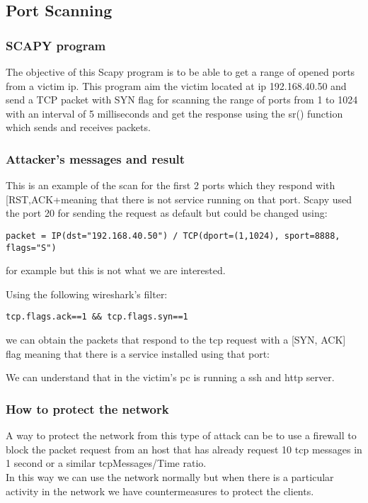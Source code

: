 \subsection{Port Scanning}
\subsubsection{SCAPY program}

The objective of this Scapy program is to be able to get a range of opened ports from a victim ip. This program aim the victim located at ip 192.168.40.50 and send a TCP packet with SYN flag for scanning the range of ports from 1 to 1024 with an interval of 5 milliseconds and get the response using the sr() function which sends and receives packets.\par

\subsubsection{Attacker’s messages and result}


This is an example of the scan for the first 2 ports which they respond with [RST,ACK+meaning that there is not service running on that port.
Scapy used the port 20 for sending the request as default but could be changed using:\\
\begin{lstlisting}
packet = IP(dst="192.168.40.50") / TCP(dport=(1,1024), sport=8888, flags="S")
\end{lstlisting}
for example but this is not what we are interested.\par
Using the following wireshark’s filter: \\
\begin{lstlisting}
tcp.flags.ack==1 && tcp.flags.syn==1
\end{lstlisting}
we can obtain the packets that respond to the tcp request with a [SYN, ACK] flag meaning that there is a service installed using that port:\par
\medskip


We can understand that in the victim’s pc is running a ssh and http server.\par

\subsubsection{How to protect the network}
A way to protect the network from this type of attack can be to use a firewall to block the packet request from an host that has already request 10 tcp messages in 1 second or a similar tcpMessages/Time ratio.\\
In this way we can use the network normally but when there is a particular activity in the network we have countermeasures to protect the clients.\par
